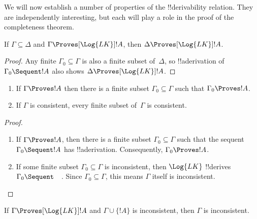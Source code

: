 \documentclass[../../../include/open-logic-section]{subfiles}
\begin{document}

We will now establish a number of properties of the !!{derivability}
relation.  They are independently interesting, but each will play a
role in the proof of the completeness theorem.

\begin{prop}[Monotony]
If $\Gamma \subseteq \Delta$ and $\Gamma \Proves[\Log{LK}] !A$, then $\Delta
\Proves[\Log{LK}] !A$.
\end{prop}

\begin{proof}
Any finite $\Gamma_0 \subseteq \Gamma$ is also a finite subset
of~$\Delta$, so !!a{derivation} of $\Gamma_0 \Sequent !A$ also shows
$\Delta \Proves[\Log{LK}] !A$.
\end{proof}

\begin{prop}[Compactness]
  \begin{enumerate}
  \item If $\Gamma \Proves !A$ then there is a finite subset $\Gamma_0
    \subseteq \Gamma$ such that $\Gamma_0 \Proves !A$.
  \item If $\Gamma$ is consistent, every finite subset of~$\Gamma$ is
    consistent.
  \end{enumerate}
\end{prop}

\begin{proof}
  \begin{enumerate}
    \item If $\Gamma \Proves !A$, then there is a finite subset
      $\Gamma_0 \subseteq \Gamma$ such that the sequent $\Gamma_0
      \Sequent !A$ has !!a{derivation}. Consequently, $\Gamma_0
      \Proves !A$.
    \item If some finite subset $\Gamma_0 \subseteq \Gamma$ is
      inconsistent, then $\Log{LK}$ !!{derive}s $\Gamma_0 \Sequent
      \quad$. Since $\Gamma_0 \subseteq \Gamma$, this means $\Gamma$
      itself is inconsistent.
  \end{enumerate}
\end{proof}

\begin{prop}
   If $\Gamma \Proves[\Log{LK}] !A$
  and $\Gamma \cup \{!A\}$ is inconsistent, then $\Gamma$
  is inconsistent.
\end{prop}
\end{document}
